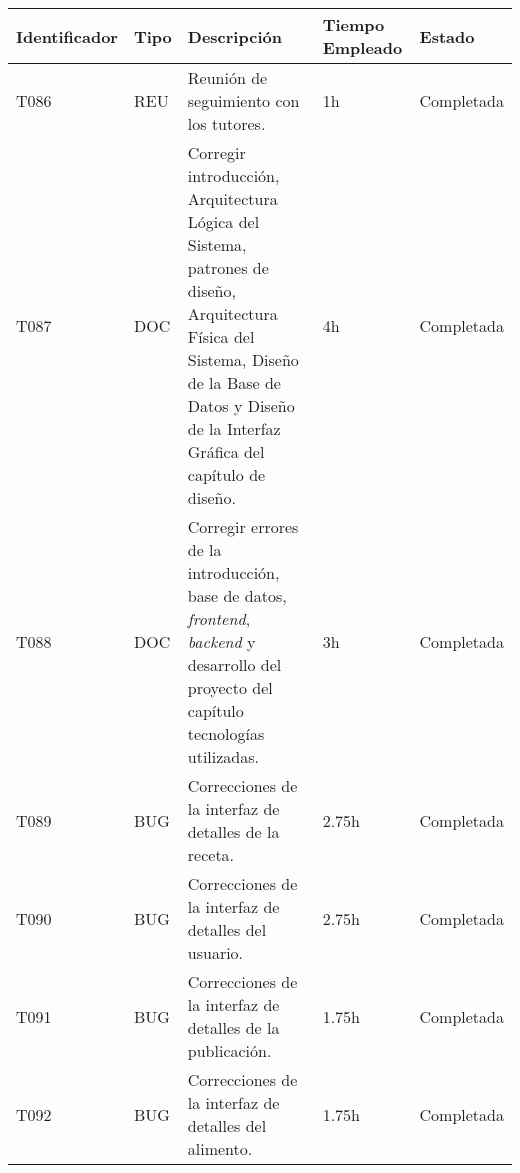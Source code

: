 \begin{table}[]
  \centering
\begin{tabular}{
  |p{}%
  |p{}%
  |p{}
  |p{}
  |p{}
  |%
  }
  \hline
  \textbf{Identificador} & \textbf{Tipo} & \textbf{Descripción}                                             & \textbf{Tiempo Empleado} & \textbf{Estado} \\ \hline
  T086                   & REU           & Reunión de seguimiento con los tutores.                             & 1h                       & Completada      \\ \hline

  T087                   & DOC           & Corregir introducción, Arquitectura Lógica del Sistema, patrones de diseño, Arquitectura Física del Sistema, Diseño de la Base de Datos y Diseño de la Interfaz Gráfica del capítulo de diseño.                 & 4h                       & Completada      \\ \hline

  T088                   & DOC          & Corregir errores de la introducción, base de datos, \textit{frontend}, \textit{backend} y desarrollo del proyecto del capítulo tecnologías utilizadas.               & 3h                       & Completada      \\ \hline







  T089                   & BUG           & Correcciones de la interfaz de detalles de la receta.                   & 2.75h                       & Completada      \\ \hline

  T090                   & BUG           & Correcciones de la interfaz de detalles del usuario.                   & 2.75h                       & Completada      \\ \hline

  T091                   & BUG           & Correcciones de la interfaz de detalles de la publicación.                   & 1.75h                       & Completada      \\ \hline

  T092                   & BUG           & Correcciones de la interfaz de detalles del alimento.                   & 1.75h                       & Completada      \\ \hline



\end{tabular}
\end{table}
